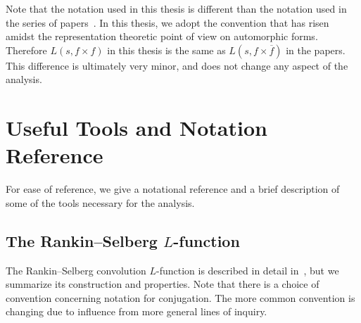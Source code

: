 \begin{remark}
  Note that the notation used in this thesis is different than the notation used in the
  series of papers~\cite{hkldw, hkldwShort, hkldwSigns}.
  In this thesis, we adopt the convention that has risen amidst the representation
  theoretic point of view on automorphic forms.
  Therefore $L(s, f \times f)$ in this thesis is the same as $L(s, f\times \overline{f})$
  in the papers.
  This difference is ultimately very minor, and does not change any aspect of the
  analysis.
\end{remark}




\section{Useful Tools and Notation Reference}

For ease of reference, we give a notational reference and a brief description of some of
the tools necessary for the analysis.



\subsection{The Rankin--Selberg $L$-function}\label{ssec:rankinselberg_lfunction}%


The Rankin--Selberg convolution $L$-function is described in detail %
in~\cite{Goldfeld2006automorphic, Bump98}, but we summarize its construction and
properties.
Note that there is a choice of convention concerning notation for conjugation.
The more common convention is changing due to influence from more general lines of
inquiry.


